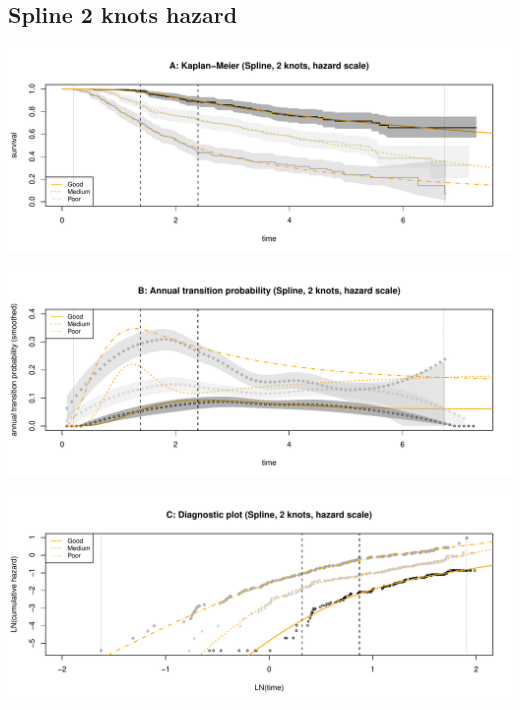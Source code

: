 \documentclass[]{article}
\begin{document}
\newpage 

\subsection{Spline 2 knots hazard}\label{spline-2-knots-hazard}

\begin{flushleft}\includegraphics[height=0.25\textheight]{Images/spline_hazard2-1} \end{flushleft}

\begin{flushleft}\includegraphics[height=0.25\textheight]{Images/spline_hazard2-2} \end{flushleft}

\begin{flushleft}\includegraphics[height=0.25\textheight]{Images/spline_hazard2-3} \end{flushleft}
\end{document}
